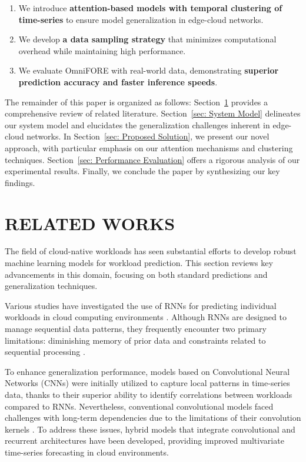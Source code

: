 \documentclass{ieeetmlcn}
\begin{document}
\begin{enumerate}
\item We introduce \textbf{attention-based models with temporal clustering of time-series} to ensure model generalization in edge-cloud networks.
\item We develop \textbf{a data sampling strategy} that minimizes computational overhead while maintaining high performance.
\item We evaluate OmniFORE with real-world data, demonstrating \textbf{superior prediction accuracy and faster inference speeds}.
\end{enumerate}

The remainder of this paper is organized as follows: Section~\ref{sec: related works} provides a comprehensive review of related literature. Section~\ref{sec: System Model} delineates our system model and elucidates the generalization challenges inherent in edge-cloud networks. In Section~\ref{sec: Proposed Solution}, we present our novel approach, with particular emphasis on our attention mechanisms and clustering techniques. Section~\ref{sec: Performance Evaluation} offers a rigorous analysis of our experimental results. Finally, we conclude the paper by synthesizing our key findings.


\section{RELATED WORKS}
\label{sec: related works}

The field of cloud-native workloads has seen substantial efforts to develop robust machine learning models for workload prediction. This section reviews key advancements in this domain, focusing on both standard predictions and generalization techniques.

Various studies have investigated the use of RNNs for predicting individual workloads in cloud computing environments \cite{yuan2024improved, saxena2023performance}. Although RNNs are designed to manage sequential data patterns, they frequently encounter two primary limitations: diminishing memory of prior data and constraints related to sequential processing \cite{hochreiter1998vanishing, benidis2022deep}.

To enhance generalization performance, models based on Convolutional Neural Networks (CNNs) \cite{LSTNet, RPTCN} were initially utilized to capture local patterns in time-series data, thanks to their superior ability to identify correlations between workloads compared to RNNs. Nevertheless, conventional convolutional models faced challenges with long-term dependencies due to the limitations of their convolution kernels \cite{acmtimeseriesreview2024}. To address these issues, hybrid models that integrate convolutional and recurrent architectures \cite{xu2022esdnn} have been developed, providing improved multivariate time-series forecasting in cloud environments.
\end{document}

